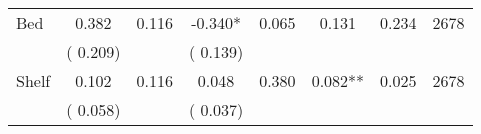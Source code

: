 \begin{tabular}{l*{7}{c}}
 Bed       &              0.382       &        0.116  &             -0.340*       &        0.065  &              0.131       &              0.234 &  2678 \\ 
                       &       (       0.209)             &                               &       (       0.139)                     &                               &                                               &                                &                      \\ 

 Shelf       &              0.102       &        0.116  &              0.048       &        0.380  &              0.082**       &              0.025 &  2678 \\ 
                       &       (       0.058)             &                               &       (       0.037)                     &                               &                                               &                                &                      \\ 

\hline \end{tabular}